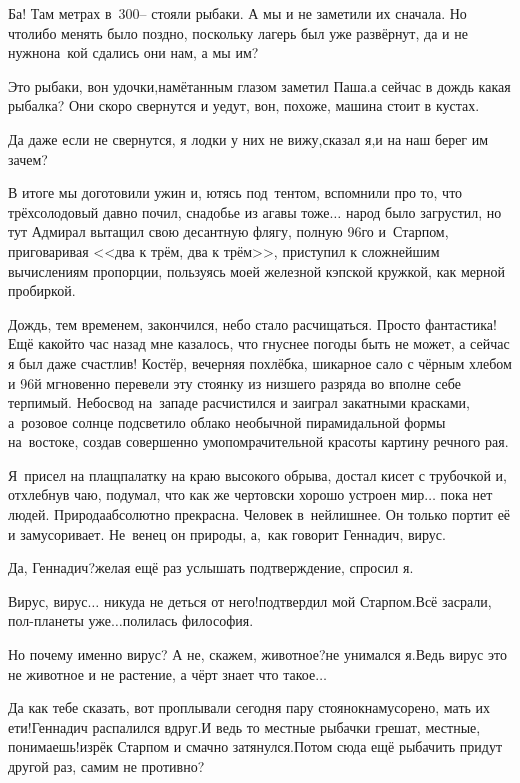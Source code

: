 Ба! Там метрах в~300\thinspace\nobreakdash-- стояли рыбаки. А мы и не заметили их сначала. Но что\sdash либо менять было поздно, поскольку лагерь был уже развёрнут, да и не нужно\mdash на~кой сдались они нам, а мы им?

\diagdash Это рыбаки, вон удочки,\mdash намётанным глазом заметил Паша.\mdash а сейчас в дождь какая рыбалка? Они скоро свернутся и уедут, вон, похоже, машина стоит в кустах.

\diagdash Да даже если не свернутся, я лодки у них не вижу,\mdash сказал я,\mdash и на наш берег им зачем?

В итоге мы доготовили ужин и, ютясь под~тентом, вспомнили про то, что трёхсолодовый давно почил, снадобье из агавы тоже$\ldots$ народ было загрустил, но тут Адмирал вытащил свою десантную флягу, полную 96\sdash го и~Старпом, приговаривая <<два к трём, два к трём>>, приступил к сложнейшим вычислениям пропорции, пользуясь моей железной кэпской кружкой, как мерной пробиркой. 

Дождь, тем временем, закончился, небо стало расчищаться. Просто фантастика! Ещё какой\sdash то час назад мне казалось, что гнуснее погоды быть не может, а сейчас я был даже счастлив! Костёр, вечерняя похлёбка, шикарное сало с чёрным хлебом и 96\sdash й мгновенно перевели эту стоянку из низшего разряда во вполне себе терпимый. Небосвод на~западе расчистился и заиграл закатными красками, а~розовое солнце подсветило облако необычной пирамидальной формы на~востоке, создав совершенно умопомрачительной красоты картину речного рая. 

Я~присел на плащ\sdash палатку на краю высокого обрыва, достал кисет с трубочкой и, отхлебнув чаю, подумал, что как же чертовски хорошо устроен мир$\ldots$ пока нет людей. Природа\mdash абсолютно прекрасна. Человек в~ней\mdash лишнее. Он только портит её и замусоривает. Не~венец он природы, а,~как говорит Геннадич, вирус.

\diagdash Да, Геннадич?\mdash желая ещё раз услышать подтверждение, спросил я.

\diagdash Вирус, вирус$\ldots$ никуда не деться от него!\mdash подтвердил мой Старпом.\mdash Всё засрали, пол-планеты уже$\ldots$\mdash полилась философия.

\diagdash Но почему именно вирус? А не, скажем, животное?\mdash не унимался я.\mdash Ведь вирус это не животное и не растение, а чёрт знает что такое$\ldots$

\diagdash Да как тебе сказать, вот проплывали сегодня пару стоянок\mdash намусорено, мать их ети!\mdash Геннадич распалился вдруг.\mdash И ведь то местные рыбачки грешат, местные, понимаешь!\mdash изрёк Старпом и смачно затянулся.\mdash Потом сюда ещё рыбачить придут другой раз, самим не противно?

